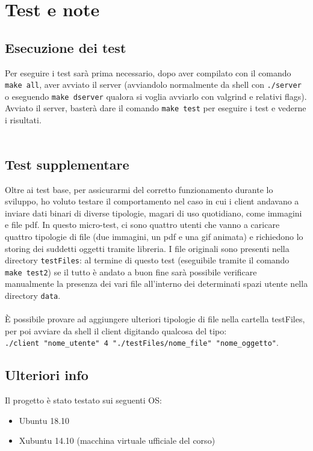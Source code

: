 \section{Test e note}
\begin{flushleft}

\subsection{Esecuzione dei test}
Per eseguire i test sarà prima necessario, dopo aver compilato con il comando \texttt{make all}, aver avviato il server (avviandolo normalmente da shell con \texttt{./server} o eseguendo \texttt{make dserver} qualora si voglia avviarlo con valgrind e relativi flags).\\
Avviato il server, basterà dare il comando \texttt{make test} per eseguire i test e vederne i risultati.\\~\\

\subsection{Test supplementare}
Oltre ai test base, per assicurarmi del corretto funzionamento durante lo sviluppo, ho voluto testare il comportamento nel caso in cui i client andavano a inviare dati binari di diverse tipologie, magari di uso quotidiano, come immagini e file pdf. In questo micro-test, ci sono quattro utenti che vanno a caricare quattro tipologie di file (due immagini, un pdf e una gif animata) e richiedono lo storing dei suddetti oggetti tramite libreria. I file originali sono presenti nella directory \texttt{testFiles}: al termine di questo test (eseguibile tramite il comando \texttt{make test2}) se il tutto è andato a buon fine sarà possibile verificare manualmente la presenza dei vari file all'interno dei determinati spazi utente nella directory \texttt{data}.\\~\\
È possibile provare ad aggiungere ulteriori tipologie di file nella cartella testFiles, per poi avviare da shell il client digitando qualcosa del tipo:\\ \texttt{./client "nome\_utente" 4 "./testFiles/nome\_file" "nome\_oggetto"}.

\subsection{Ulteriori info}
Il progetto è stato testato sui seguenti OS:
\begin{itemize}
\item Ubuntu 18.10
\item Xubuntu 14.10 (macchina virtuale ufficiale del corso)
\end{itemize}

\end{flushleft}


